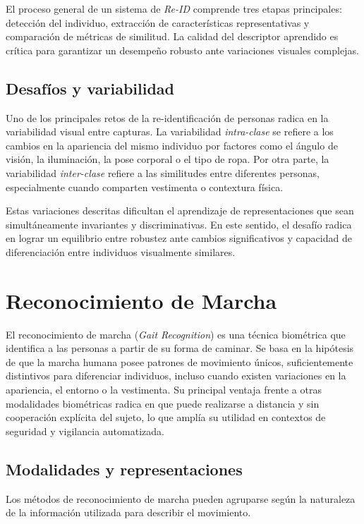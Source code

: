 El proceso general de un sistema de \textit{Re-ID} comprende tres etapas principales: detección del individuo, extracción de características representativas y comparación de métricas de similitud. La calidad del descriptor aprendido es crítica para garantizar un desempeño robusto ante variaciones visuales complejas.

\subsection{Desafíos y variabilidad}

Uno de los principales retos de la re-identificación de personas radica en la variabilidad visual entre capturas. La variabilidad \textit{intra-clase} se refiere a los cambios en la apariencia del mismo individuo por factores como el ángulo de visión, la iluminación, la pose corporal o el tipo de ropa. Por otra parte, la variabilidad \textit{inter-clase} refiere a las similitudes entre diferentes personas, especialmente cuando comparten vestimenta o contextura física.

Estas variaciones descritas dificultan el aprendizaje de representaciones que sean simultáneamente invariantes y discriminativas. En este sentido, el desafío radica en lograr un equilibrio entre robustez ante cambios significativos y capacidad de diferenciación entre individuos visualmente similares.

\section{Reconocimiento de Marcha}

El reconocimiento de marcha (\textit{Gait Recognition}) es una técnica biométrica que identifica a las personas a partir de su forma de caminar. Se basa en la hipótesis de que la marcha humana posee patrones de movimiento únicos, suficientemente distintivos para diferenciar individuos, incluso cuando existen variaciones en la apariencia, el entorno o la vestimenta. Su principal ventaja frente a otras modalidades biométricas radica en que puede realizarse a distancia y sin cooperación explícita del sujeto, lo que amplía su utilidad en contextos de seguridad y vigilancia automatizada.

\subsection{Modalidades y representaciones}

Los métodos de reconocimiento de marcha pueden agruparse según la naturaleza de la información utilizada para describir el movimiento.

